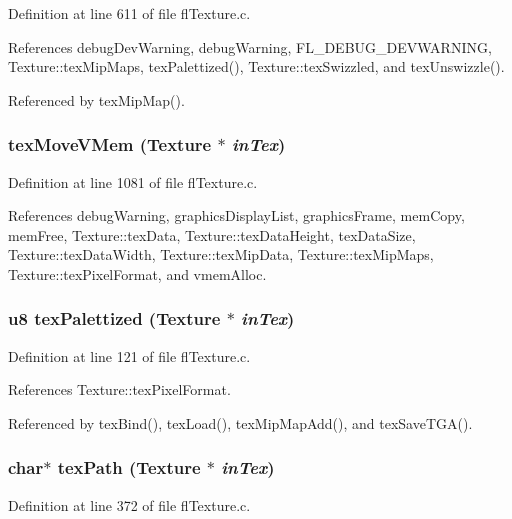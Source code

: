 Definition at line 611 of file fl\-Texture.c.

References debug\-Dev\-Warning, debug\-Warning, FL\_\-DEBUG\_\-DEVWARNING, Texture::tex\-Mip\-Maps, tex\-Palettized(), Texture::tex\-Swizzled, and tex\-Unswizzle().

Referenced by tex\-Mip\-Map().
\subsubsection{ tex\-Move\-VMem ({\bf Texture} $\ast$ {\em in\-Tex})}\label{flTexture_8c_2ef41233c1e08b86325c0453443cd6dd}




Definition at line 1081 of file fl\-Texture.c.

References debug\-Warning, graphics\-Display\-List, graphics\-Frame, mem\-Copy, mem\-Free, Texture::tex\-Data, Texture::tex\-Data\-Height, tex\-Data\-Size, Texture::tex\-Data\-Width, Texture::tex\-Mip\-Data, Texture::tex\-Mip\-Maps, Texture::tex\-Pixel\-Format, and vmem\-Alloc.
\subsubsection{\setlength{\rightskip}{0pt plus 5cm}u8 tex\-Palettized ({\bf Texture} $\ast$ {\em in\-Tex})\hspace{0.3cm}{\tt  [inline]}}\label{flTexture_8c_b4c79c10195fdf369c6c9152a350eb78}




Definition at line 121 of file fl\-Texture.c.

References Texture::tex\-Pixel\-Format.

Referenced by tex\-Bind(), tex\-Load(), tex\-Mip\-Map\-Add(), and tex\-Save\-TGA().
\subsubsection{\setlength{\rightskip}{0pt plus 5cm}char$\ast$ tex\-Path ({\bf Texture} $\ast$ {\em in\-Tex})}\label{flTexture_8c_2aae7806529590f9b74414da4a2c20a8}




Definition at line 372 of file fl\-Texture.c.

